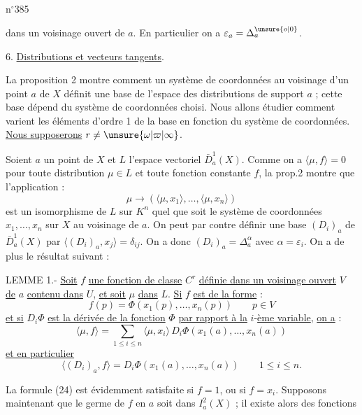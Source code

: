 
n$^{\circ}$385

dans un voisinage ouvert de $a$. En particulier on a $\varepsilon_a=\Delta_a^{\unsure{o|0}}$.

6. \uline{Distributions et vecteurs tangents}.

La proposition 2 montre comment un système de coordonnées au voisinage d'un point $a$ de $X$ définit une base de l'espace des distributions de support $a$ ; cette base dépend du système de coordonnées choisi. Nous allons étudier comment varient les éléments d'ordre 1 de la base en fonction du système de coordonnées. \uline{Nous supposerons} $r\ne\unsure{\omega|\varpi|\infty}$.

Soient $a$ un point de $X$ et $L$ l'espace vectoriel $\bar D_a^1(X)$. Comme on a $\langle\mu,f\rangle=0$ pour toute distribution $\mu\in L$ et toute fonction constante $f$, la prop.2 montre que l'application :
\[
\mu\longrightarrow(\langle\mu,x_1\rangle,\ldots,\langle\mu,x_n\rangle)\tag*{(22)}
\]
est un isomorphisme de $L$ sur $K^n$ quel que soit le système de coordonnées $x_1,\ldots,x_n$ sur $X$ au voisinage de $a$. On peut par contre définir une base $(D_i)_a$ de $\bar D_a^1(X)$ par $\langle(D_i)_a,x_j\rangle=\delta_{ij}$. On a donc $(D_i)_a=\Delta_a^\alpha$ avec $\alpha=\varepsilon_i$. On a de plus le résultat suivant :

LEMME 1.- \uline{Soit} $f$ \uline{une fonction de classe} $C^r$ \uline{définie dans un voisinage ouvert} $V$ \uline{de} $a$ \uline{contenu dans} $U$, \uline{et soit} $\mu$ \uline{dans} $L$. \uline{Si} $f$ \uline{est de la forme} :
\[
f(p)=\Phi(x_1(p),\ldots,x_n(p))\qquad p\in V\tag*{(23)}
\]
\uline{et si} $D_i\Phi$ \uline{est la dérivée de la fonction} $\Phi$ \uline{par rapport à la} $i$-\uline{ème variable}, \uline{on a} :
\[
\langle\mu,f\rangle=\sum_{1\leq i\leq n}\langle\mu,x_i\rangle\,D_i\Phi(x_1(a),\ldots,x_n(a))\tag*{(24)}
\]
\uline{et en particulier}
\[
\langle(D_i)_a,f\rangle=D_i\Phi(x_1(a),\ldots,x_n(a))\qquad 1\leq i\leq n.\tag*{(25)}
\]

La formule (24) est évidemment satisfaite si $f=1$, ou si $f=x_i$. Supposons maintenant que le germe de $f$ en $a$ soit dans $I_a^2(X)$ ; il existe alors des fonctions

